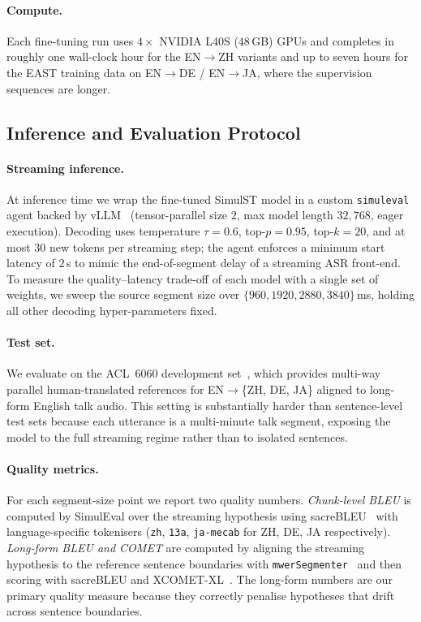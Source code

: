 \paragraph{Compute.} Each fine-tuning run uses $4{\times}$ NVIDIA L40S
($48$\,GB) GPUs and completes in roughly one wall-clock hour for the
EN$\rightarrow$ZH variants and up to seven hours for the EAST training data
on EN$\rightarrow$DE / EN$\rightarrow$JA, where the supervision sequences
are longer.

\subsection{Inference and Evaluation Protocol}
\label{sec:setup-eval}

\paragraph{Streaming inference.} At inference time we wrap the fine-tuned
SimulST model in a custom \texttt{simuleval}~\citep{ma2020simuleval} agent
backed by vLLM~\citep{kwon2023vllm} (tensor-parallel size $2$, max model
length $32{,}768$, eager execution). Decoding uses temperature $\tau{=}0.6$,
top-$p{=}0.95$, top-$k{=}20$, and at most $30$ new tokens per streaming
step; the agent enforces a minimum start latency of $2$\,s to mimic the
end-of-segment delay of a streaming ASR front-end. To measure the
quality--latency trade-off of each model with a single set of weights, we
sweep the source segment size over
$\{960, 1920, 2880, 3840\}$\,ms, holding all other decoding hyper-parameters
fixed.

\paragraph{Test set.} We evaluate on the ACL~6060 development
set~\citep{salesky2023acl6060}, which provides multi-way parallel
human-translated references for EN$\rightarrow$\{ZH, DE, JA\} aligned to
long-form English talk audio. This setting is substantially harder than
sentence-level test sets because each utterance is a multi-minute talk
segment, exposing the model to the full streaming regime rather than to
isolated sentences.

\paragraph{Quality metrics.} For each segment-size point we report two
quality numbers. \emph{Chunk-level BLEU} is computed by SimulEval over the
streaming hypothesis using sacre\-BLEU~\citep{post2018sacrebleu} with
language-specific tokenisers
(\texttt{zh}, \texttt{13a}, \texttt{ja-mecab} for ZH, DE, JA respectively).
\emph{Long-form BLEU and COMET} are computed by aligning the streaming
hypothesis to the reference sentence boundaries with
\texttt{mwerSegmenter}~\citep{matusov2005evaluating} and then scoring with
sacre\-BLEU and \textsc{XCOMET-XL}~\citep{guerreiro2024xcomet}.
The long-form numbers are our primary quality measure because they correctly
penalise hypotheses that drift across sentence boundaries.

